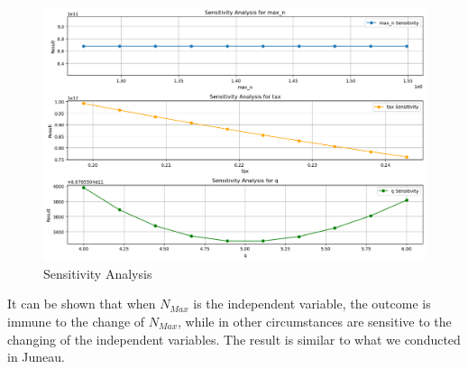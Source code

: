 \begin{figure}[H]
    \centering
    \includegraphics[width=1\textwidth]{Sensitivity_Analysis_Sitka.jpg} %
    \vspace{-0.5cm}
    \caption{Sensitivity Analysis}
\end{figure}

It can be shown that when $N_{Max}$ is the independent variable, the outcome is immune to the change of $N_{Max}$,
while in other circumstances are sensitive to the changing of the independent variables.
The result is similar to what we conducted in Juneau.